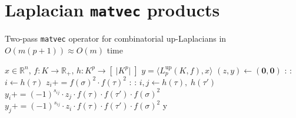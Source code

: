 \documentclass[10pt]{article}
\numberwithin{equation}{section}
\newcommand{\+}{%
	\raisebox{0.18ex}{\scaleobj{0.55}{+}}
}
\theoremstyle{definition}
\begin{document}
\section{Laplacian \texttt{matvec} products}\label{sec:up_laplace_matvec}
\begin{algorithm}
\caption{Two-pass \texttt{matvec} operator for combinatorial up-Laplacians in $O(m(p+1)) \approx O(m)$ time }	
\begin{algorithmic}
\Require $x \in \mathbb{R}^n, \, f: K \to \mathbb{R}_{+}, \, h: K^p \to [\; \lvert K^p\rvert \;]$
\Ensure $y = \langle L_p^{\mathrm{up}}(K, f), x \rangle$
\vspace{0.25em}
\State $(z, y) \gets (\mathbf{0}, \mathbf{0})$ 
: 
	\For{$\tau \in \partial[\sigma]$}:
		\State $i \gets h(\tau)$
   	 	\State $z_{i} \mathrel{{+}{=}} f(\sigma)^2 \cdot f(\tau)^2$
   	\EndFor
\EndFor
:
    : %
	    	\State $i, j \gets h(\tau), \; h(\tau')$ %
    		\State $y_{i} \mathrel{{+}{=}} (-1)^{s_{ij}} \cdot z_{j} \cdot f(\tau) \cdot f(\tau') \cdot f(\sigma)^2$
    		\State $y_{j} \mathrel{{+}{=}} (-1)^{s_{ij}} \cdot z_{i} \cdot f(\tau) \cdot f(\tau') \cdot f(\sigma)^2$
    \EndFor 
\EndFor
\Return y 
\EndFunction
\end{algorithmic}
\end{algorithm}
\end{document}
